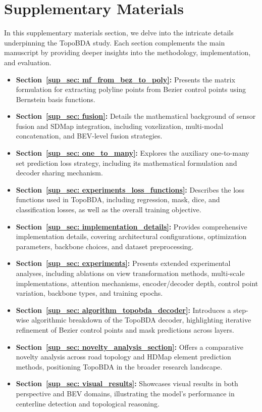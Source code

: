 \renewcommand{\thesection}{S}
\section{Supplementary Materials}
\beginsupplement

In this supplementary materials section, we delve into the intricate details underpinning the TopoBDA study. Each section complements the main manuscript by providing deeper insights into the methodology, implementation, and evaluation.

\begin{itemize}
    \item \textbf{Section~\ref{sup_sec: mf_from_bez_to_poly}:} Presents the matrix formulation for extracting polyline points from Bezier control points using Bernstein basis functions.
    \item \textbf{Section~\ref{sup_sec: fusion}:} Details the mathematical background of sensor fusion and SDMap integration, including voxelization, multi-modal concatenation, and BEV-level fusion strategies.
    \item \textbf{Section~\ref{sup_sec: one_to_many}:} Explores the auxiliary one-to-many set prediction loss strategy, including its mathematical formulation and decoder sharing mechanism.
    \item \textbf{Section~\ref{sup_sec: experiments_loss_functions}:} Describes the loss functions used in TopoBDA, including regression, mask, dice, and classification losses, as well as the overall training objective.
    \item \textbf{Section~\ref{sup_sec: implementation_details}:} Provides comprehensive implementation details, covering architectural configurations, optimization parameters, backbone choices, and dataset preprocessing.
    \item \textbf{Section~\ref{sup_sec: experiments}:} Presents extended experimental analyses, including ablations on view transformation methods, multi-scale implementations, attention mechanisms, encoder/decoder depth, control point variation, backbone types, and training epochs.
    \item \textbf{Section~\ref{sup_sec: algorithm_topobda_decoder}:} Introduces a step-wise algorithmic breakdown of the TopoBDA decoder, highlighting iterative refinement of Bezier control points and mask predictions across layers.
    \item \textbf{Section~\ref{sup_sec: novelty_analysis_section}:} Offers a comparative novelty analysis across road topology and HDMap element prediction methods, positioning TopoBDA in the broader research landscape.
    \item \textbf{Section~\ref{sup_sec: visual_results}:} Showcases visual results in both perspective and BEV domains, illustrating the model’s performance in centerline detection and topological reasoning.
\end{itemize}

